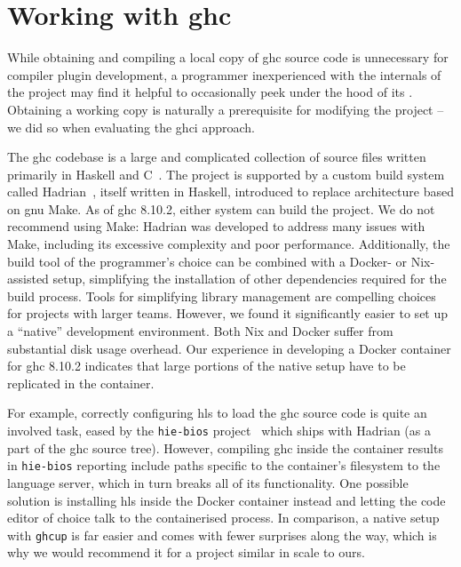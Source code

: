 \documentclass[thesis=B,english]{FITthesis}[2019/12/23]
\begin{document}
\section{Working with \acrshort{ghc}}
While obtaining and compiling a local copy of \acrshort{ghc} source code is
unnecessary for compiler plugin development, a programmer inexperienced with
the internals of the project may find it helpful to occasionally peek under the
hood of its . Obtaining a working copy is naturally a
prerequisite for modifying the project -- we did so when evaluating the
\acrshort{ghci} approach.

The \acrshort{ghc} codebase is a large and complicated collection of source
files written primarily in Haskell and C~\cite{arch-ghc}. The project is
supported by a custom build system called Hadrian~\cite{hadrian}, itself
written in Haskell, introduced to replace architecture based on \acrshort{gnu}
Make. As of \acrshort{ghc} 8.10.2, either system can build the project. We do
not recommend using Make: Hadrian was developed to address many issues with
Make, including its excessive complexity and poor performance. Additionally,
the build tool of the programmer's choice can be combined with a Docker- or
Nix-assisted setup, simplifying the installation of other dependencies required
for the build process. Tools for simplifying library management are compelling
choices for projects with larger teams. However, we found it significantly
easier to set up a ``native'' development environment. Both Nix and Docker
suffer from substantial disk usage overhead. Our experience in developing a
Docker container for \acrshort{ghc} 8.10.2 indicates that large portions of the
native setup have to be replicated in the container.

For example, correctly configuring \acrshort{hls} to load the \acrshort{ghc}
source code is quite an involved task, eased by the \texttt{hie-bios}
project~\cite{gh-hie-bios} which ships with Hadrian (as a part of the
\acrshort{ghc} source tree). However, compiling \acrshort{ghc} inside the
container results in \texttt{hie-bios} reporting include paths specific to the
container's file\-system to the language server, which in turn breaks all of
its functionality. One possible solution is installing \acrshort{hls} inside
the Docker container instead and letting the code editor of choice talk to the
containerised process. In comparison, a native setup with \texttt{ghcup} is
far easier and comes with fewer surprises along the way, which is why we would
recommend it for a project similar in scale to ours.
\end{document}
